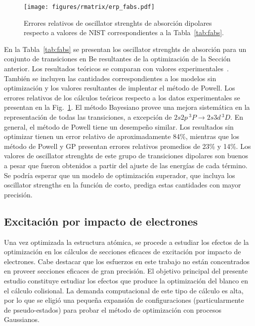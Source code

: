 \begin{figure}[t]
\centering
\texttt{[image: figures/rmatrix/erp\_fabs.pdf]} 
\caption{Errores relativos de oscillator strenghts de absorción 
dipolares respecto a valores de NIST correspondientes a la 
Tabla~\ref{tab:fabs}.}
\label{fig:fabs}
\end{figure}

En la Tabla~\ref{tab:fabs} se presentan los oscillator strenghts de 
absorción para un conjunto de transiciones en Be resultantes de la 
optimización de la Sección anterior. Los resultados teóricos se comparan 
con valores experimentales~\cite{NIST}. También se incluyen las 
cantidades correspondientes a los modelos sin optimización y los valores 
resultantes de implentar el método de Powell. Los errores relativos de 
los cálculos teóricos respecto a los datos experimentales se presentan 
en la Fig.~\ref{fig:fabs}. El método Bayesiano provee una mejora 
sistemática en la representación de todas las transiciones, a excepción 
de $2s2p\,^3P\rightarrow 2s3d\,^3D$. En general, el método de Powell 
tiene un desempeño similar. Los resultados sin optimizar tienen un error 
relativo de aproximadamente 84\%, mientras que los método de Powell y GP 
presentan errores relativos promedios de 23\% y 14\%. Los valores de
oscillator strenghts de este grupo de transiciones dipolares son buenos
a pesar que fueron obtenidos a partir del ajuste de las energías de cada
término. Se podría esperar que un modelo de optimización superador, que 
incluya los oscillator strengths en la función de costo, prediga estas 
cantidades con mayor precisión.

\subsection{Excitación por impacto de electrones}

Una vez optimizada la estructura atómica, se procede a estudiar los 
efectos de la optimización en los cálculos de secciones eficaces de 
excitación por impacto de electrones. 
Cabe destacar que los esfuerzos en este trabajo no están concentrados en 
proveer secciones eficaces de gran precisión. El objetivo principal del 
presente estudio constituye estudiar los efectos que produce la 
optimización del blanco en el cálculo colisional. 
La demanda computacional de este tipo de cálculo es alta, por lo que se 
eligió una pequeña expansión de configuraciones (particularmente de 
pseudo-estados) para probar el método de optimización con procesos 
Gaussianos. 

